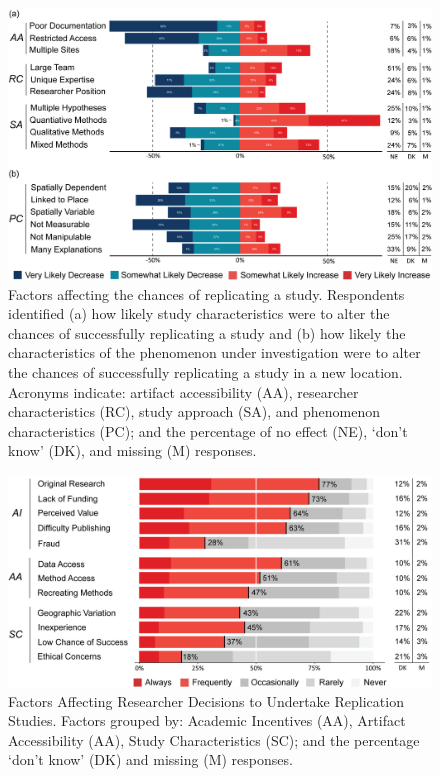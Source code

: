 \documentclass[]{interact}
\theoremstyle{plain}%
\theoremstyle{definition}
\theoremstyle{remark}
\begin{document}
\newpage

\begin{figure}[hbt!]
    \centering
    \includegraphics[scale=0.8]{results/figures/Fig-Q8-10-Chances.png}
    \caption{Factors affecting the chances of replicating a study. Respondents identified (a) how likely study characteristics were to alter the chances of successfully replicating a study and (b) how likely the characteristics of the phenomenon under investigation were to alter the chances of successfully replicating a study in a new location. Acronyms indicate: artifact accessibility (AA), researcher characteristics (RC), study approach (SA), and phenomenon characteristics (PC); and the percentage of no effect (NE), `don't know' (DK), and missing (M) responses.}
    \label{fig:Q8-10-Chances}
\end{figure}

\newpage

\begin{figure}[hbt!]
    \centering
    \includegraphics[scale=0.80]{results/figures/Fig-Q15-Decisions.png}
    \caption{Factors Affecting Researcher Decisions to Undertake Replication Studies. Factors grouped by: Academic Incentives (AA), Artifact Accessibility (AA), Study Characteristics (SC); and the percentage `don't know' (DK) and missing (M) responses.}
    \label{fig:Q15-DecisionFactors}
\end{figure}
\end{document}
